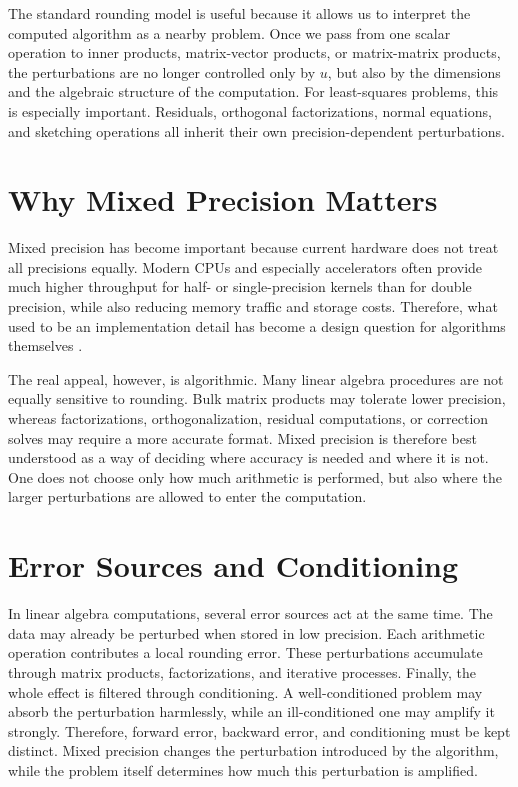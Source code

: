 The standard rounding model is useful because it allows us to interpret the
computed algorithm as a nearby problem. Once we pass from one scalar operation
to inner products, matrix-vector products, or matrix-matrix products, the
perturbations are no longer controlled only by \(u\), but also by the dimensions
and the algebraic structure of the computation. For least-squares problems, this is
especially important. Residuals, orthogonal factorizations, normal equations, and
sketching operations all inherit their own precision-dependent perturbations.

\section{Why Mixed Precision Matters}

Mixed precision has become important because current hardware does not treat all
precisions equally. Modern CPUs and especially accelerators often provide much
higher throughput for half- or single-precision kernels than for double precision,
while also reducing memory traffic and storage costs. Therefore, what used to be
an implementation detail has become a design question for algorithms themselves
\cite{abdelfattah2021mixedsurvey,higham2022mixed}.

The real appeal, however, is algorithmic. Many linear algebra procedures are not
equally sensitive to rounding. Bulk matrix products may tolerate lower precision,
whereas factorizations, orthogonalization, residual computations, or correction
solves may require a more accurate format. Mixed precision is therefore best
understood as a way of deciding where accuracy is needed and where it is not.
One does not choose only how much arithmetic is performed, but also where the
larger perturbations are allowed to enter the computation.

\section{Error Sources and Conditioning}

In linear algebra computations, several error sources act at the same time. The
data may already be perturbed when stored in low precision. Each arithmetic
operation contributes a local rounding error. These perturbations accumulate
through matrix products, factorizations, and iterative processes. Finally, the whole
effect is filtered through conditioning. A well-conditioned problem may absorb the
perturbation harmlessly, while an ill-conditioned one may amplify it strongly.
Therefore, forward error, backward error, and conditioning must be kept distinct.
Mixed precision changes the perturbation introduced by the algorithm, while the
problem itself determines how much this perturbation is amplified.

